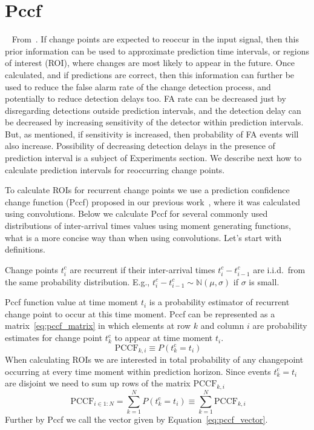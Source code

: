 \section{Pccf }~\label{sec:pccf}
From~\cite{Maslov2021}.
If change points are expected to reoccur in the input signal, then this prior information can be used to approximate prediction time intervals, or regions of interest (ROI), where changes are most likely to appear in the future.
Once calculated, and if predictions are correct, then this information can further be used to reduce the false alarm rate of the change detection process, and potentially to reduce detection delays too.
FA rate can be decreased just by disregarding detections outside prediction intervals, and the detection delay can be decreased by increasing sensitivity of the detector within prediction intervals.
But, as mentioned, if sensitivity is increased, then probability of FA events will also increase.
Possibility of decreasing detection delays in the presence of prediction interval is a subject of Experiments section.
We describe next how to calculate prediction intervals for reoccurring change points.

To calculate ROIs for recurrent change points we use a prediction confidence change function (Pccf) proposed in our previous work~\cite{MaslovSDM2016}, where it was calculated using convolutions.
Below we calculate Pccf for several commonly used distributions of inter-arrival times values using moment generating functions, what is a more concise way than when using convolutions.
Let's start with definitions.
\begin{definition}
	Change points $t_i^{\text{c}}$ are recurrent if their inter-arrival times $t_{i}^{c} - t_{i-1}^{c}$
	are i.i.d.\ from the same probability distribution.
	E.g., $t_{i}^{c} - t_{i-1}^{c} \sim \mathbb{N}(\mu, \sigma)$ if $\sigma$ is small.
\end{definition}
Pccf function value at time moment $t_i$ is a probability estimator of recurrent change point to occur at this time moment.
Pccf can be represented as a matrix~\ref{eq:pccf_matrix} in which elements at row $k$ and column $i$ are probability estimates for change point $t_k^{\text{c}}$ to appear at time moment $t_i$.
\begin{equation}~\label{eq:pccf_matrix}
	\text{PCCF}_{k,i} \equiv P(t_{k}^{\text{c}} = t_i) %
\end{equation}
When calculating ROIs we are interested in total probability of any changepoint occurring at every time moment within prediction horizon.
Since events $t_k^{\text{c}} = t_i$ are disjoint we need to sum up rows of the matrix $\text{PCCF}_{k,i}$
\begin{equation}~\label{eq:pccf_vector}
	\text{PCCF}_{i \in 1:N} = \sum_{k=1}^{N} P(t_k^{\text{c}} = t_i) \equiv \sum_{k=1}^{N} \text{PCCF}_{k,i}
\end{equation}
Further by Pccf we call the vector given by Equation~\ref{eq:pccf_vector}.

